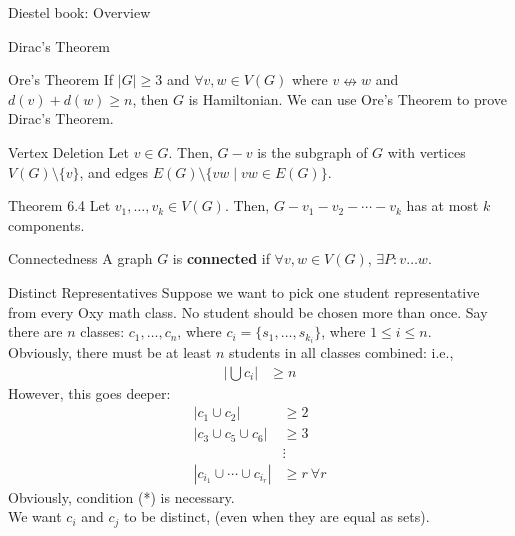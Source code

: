 \documentclass[10pt]{extarticle}
\begin{document}
{\begin{problem}{Diestel book: Overview}
\begin{problem}{Dirac's Theorem}
\begin{description}
      \end{description}
    \end{problem}
    \begin{problem}{Ore's Theorem}
      If $|G| \geq 3$ and $\forall v,w\in V(G)$ where $v \nleftrightarrow w$ and $d(v) + d(w) \geq n$, then $G$ is Hamiltonian.
      \tcblower
      We can use Ore's Theorem to prove Dirac's Theorem.
    \end{problem}
    \begin{problem}{Vertex Deletion}
      Let $v\in G$. Then, $G-v$ is the subgraph of $G$ with vertices $V(G)\setminus \{v\}$, and edges $E(G)\setminus \{vw\mid vw\in E(G)\}$.
    \end{problem}
    \begin{problem}{Theorem 6.4}
      Let $v_1,\dots,v_k\in V(G)$. Then, $G-v_1-v_2-\cdots-v_k$ has at most $k$ components.
      \begin{problem}{Connectedness}
        A graph $G$ is \textbf{connected} if $\forall v,w\in V(G)$, $\exists P: v\dots w$.
      \end{problem}
    \end{problem}
  \end{problem}
  \begin{problem}{Distinct Representatives}
    Suppose we want to pick one student representative from every Oxy math class. No student should be chosen more than once. Say there are $n$ classes: $c_1,\dots,c_n$, where $c_i = \{s_1,\dots,s_{k_i}\}$, where $1\leq i \leq n$.\\

    Obviously, there must be at least $n$ students in all classes combined: i.e.,
    \begin{align*}
      \left|\bigcup c_i\right| &\geq n
    \end{align*}
    However, this goes deeper:
    \begin{align*}
      |c_1 \cup c_2| &\geq 2\\
      |c_3 \cup c_5 \cup c_6| &\geq 3\\
                              &\vdots\\
      |c_{i_1} \cup \cdots \cup c_{i_r}| &\geq r~\forall r\tag*{(*)}
    \end{align*}
    Obviously, condition (*) is necessary.\\

    We want $c_i$ and $c_j$ to be distinct, (even when they are equal as sets).\\


\end{problem}}
\end{document}
